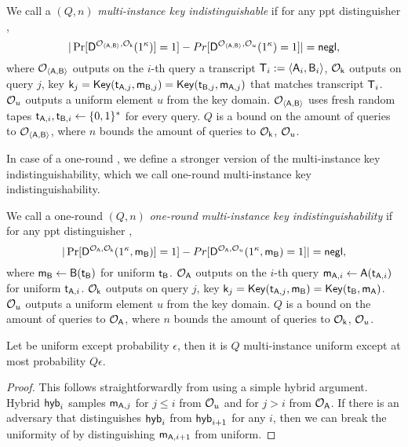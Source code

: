 \begin{definition}
We call a \UKA $(Q,n)$ \emph{multi-instance key indistinguishable} if for any ppt distinguisher \D,
$$
|\Pr[\mathsf D^{\mathcal{O}_{\langle \mathsf{A},\mathsf{B}\rangle}, \mathcal{O}_{\mathsf{k}}}(1^{\kappa})]=1]-Pr[\mathsf D^{\mathcal{O}_{\langle \mathsf{A},\mathsf{B}\rangle},\mathcal{O}_{u}}(1^{\kappa})=1]|=\mathsf{negl},
$$
where $\mathcal{O}_{\langle \mathsf{A},\mathsf{B}\rangle}$ outputs on the $i$-th query a transcript $\mathsf{T}_i:=\langle \mathsf{A}_i,\mathsf{B}_i\rangle$, $\mathcal{O}_{\mathsf{k}}$ outputs on query $j$, key $\mathsf{k}_j=\mathsf{Key}(\mathsf{t}_{\mathsf{A},j},\mathsf{m}_{\mathsf{B},j})=\mathsf{Key}(\mathsf{t}_{\mathsf{B},j},\mathsf{m}_{\mathsf{A},j})$ that matches transcript $\mathsf{T}_i$. $\mathcal{O}_u$ outputs a uniform element $u$ from the key domain. $\mathcal{O}_{\langle \mathsf{A},\mathsf{B}\rangle}$ uses fresh random tapes $\mathsf{t}_{\mathsf{A},i},\mathsf{t}_{\mathsf{B},i}\leftarrow\{0,1\}^*$ for every query. $Q$ is a bound on the amount of queries to $\mathcal{O}_{\langle \mathsf{A},\mathsf{B}\rangle}$, where $n$ bounds the amount of queries to $\mathcal{O}_{\mathsf{k}}$, $\mathcal{O}_{u}$. 
\end{definition}

In case of a one-round \UKA, we define a stronger version of the multi-instance key indistinguishability, which we call one-round multi-instance key indistinguishability.

\begin{definition}
We call a one-round \UKA $(Q,n)$ \emph{one-round multi-instance key indistinguishability} if for any ppt distinguisher \D,
$$
|\Pr[\mathsf D^{\mathcal{O}_{\mathsf{A}}, \mathcal{O}_{\mathsf{k}}}(1^{\kappa},\mathsf{m}_\mathsf{B})]=1]-Pr[\mathsf D^{\mathcal{O}_{\mathsf{A}},\mathcal{O}_{u}}(1^{\kappa},\mathsf{m}_\mathsf{B})=1]|=\mathsf{negl},
$$
where $\mathsf{m}_{\mathsf{B}}\leftarrow\mathsf{B}(\mathsf{t}_{\mathsf{B}})$ for uniform $\mathsf{t}_{\mathsf{B}}$. $\mathcal{O}_{\mathsf{A}}$ outputs on the $i$-th query $\mathsf{m}_{\mathsf{A},i}\leftarrow \mathsf{A}(\mathsf{t}_{\mathsf{A},i})$ for uniform $\mathsf{t}_{\mathsf{A},i}$. $\mathcal{O}_{\mathsf{k}}$ outputs on query $j$, key $\mathsf{k}_j=\mathsf{Key}(\mathsf{t}_{\mathsf{A},j},\mathsf{m}_{\mathsf{B}})=\mathsf{Key}(\mathsf{t}_{\mathsf{B}},\mathsf{m}_{\mathsf{A}})$. $\mathcal{O}_u$ outputs a uniform element $u$ from the key domain. $Q$ is a bound on the amount of queries to $\mathcal{O}_{\mathsf{A}}$, where $n$ bounds the amount of queries to $\mathcal{O}_{\mathsf{k}}$, $\mathcal{O}_{u}$. 
\end{definition}

 
\begin{lemma}\label{lem:multuniform}
Let \UKA be uniform except probability $\epsilon$, then it is $Q$ multi-instance uniform except at most probability $Q\epsilon$.
\end{lemma}
\begin{proof}
This follows straightforwardly from using a simple hybrid argument. Hybrid $\mathsf{hyb}_{i}$ samples $\mathsf{m}_{\mathsf{A},j}$ for $j\leq i$ from $\mathcal{O}_u$ and for $j>i$ from $\mathcal{O}_{\mathsf{A}}$. If there is an adversary that distinguishes $\mathsf{hyb}_i$ from $\mathsf{hyb}_{i+1}$ for any $i$, then we can break the uniformity of \UKA by distinguishing $\mathsf{m}_{\mathsf{A},i+1}$ from uniform.  
\pe
\end{proof}

